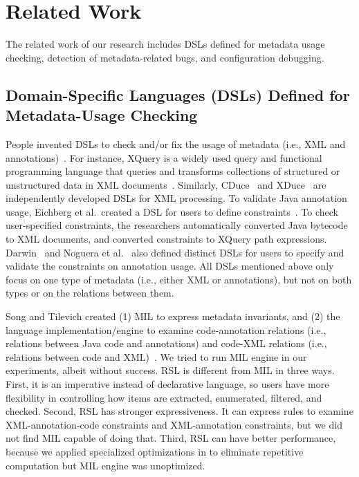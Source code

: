 \section{Related Work}
\label{se:related}
The related work of our research includes DSLs defined for metadata usage checking, detection of metadata-related bugs, and configuration debugging.

  \vspace{-.5em}
\subsection{Domain-Specific Languages (DSLs) Defined for Metadata-Usage Checking}

People invented DSLs to check and/or fix the usage of metadata (i.e., XML and annotations)~\cite{
benzaken2003cduce,chamberlin2002xquery,hosoya2003xduce,darwin2009annabot,eichberg2005using,Song12,noguera2008annotation}. For instance, XQuery is a widely used query and functional programming language that queries and transforms collections of structured or unstructured data in XML documents~\cite{chamberlin2002xquery}. Similarly, CDuce~\cite{benzaken2003cduce} and XDuce~\cite{hosoya2003xduce} are independently developed DSLs for XML processing. 
To validate Java annotation usage, 
Eichberg et al.~created a DSL for users to define constraints~\cite{eichberg2005using}. To check user-specified constraints, the researchers automatically converted Java bytecode to XML documents, and converted constraints to XQuery path expressions.  Darwin~\cite{darwin2009annabot} and Noguera et al.~\cite{noguera2008annotation} also  defined distinct DSLs for users to specify and  validate the constraints on annotation usage. 
All DSLs mentioned above only focus on one type of metadata (i.e., either XML or annotations), but not on both types or on the relations between them. 



Song and Tilevich created (1) MIL to express metadata invariants, and (2) the language implementation/engine to 
examine code-annotation relations (i.e., relations between Java code and annotations) and code-XML relations (i.e., relations between code and XML)~\cite{Song12}. We tried to run MIL engine in our experiments, albeit without success. RSL is different from MIL in three ways. First, it is an imperative instead of declarative language, so users have more flexibility in controlling how items are extracted, enumerated, filtered, and checked. 
Second, RSL has stronger expressiveness. It can express rules to examine 
XML-annotation-code constraints and XML-annotation constraints, but we did not find MIL capable of doing that. Third, RSL can  have better performance, because we applied specialized optimizations in \tool to eliminate repetitive computation but MIL engine was unoptimized.

